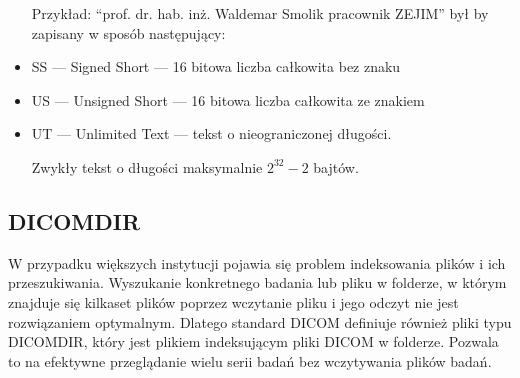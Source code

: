 \begin{itemize}
          Przykład: \enquote{prof. dr. hab. inż. Waldemar Smolik pracownik ZEJIM} był by zapisany w sposób następujący: 

    \item SS --- Signed Short --- 16 bitowa liczba całkowita bez znaku

    \item US --- Unsigned Short --- 16 bitowa liczba całkowita ze znakiem

    \item UT --- Unlimited Text --- tekst o nieograniczonej długości.

          Zwykły tekst o długości maksymalnie $2^{32}-2$ bajtów.
\end{itemize}

\subsection{DICOMDIR}

W przypadku większych instytucji pojawia się problem indeksowania plików i ich przeszukiwania.
Wyszukanie konkretnego badania lub pliku w folderze, w którym znajduje się kilkaset plików poprzez wczytanie pliku i jego odczyt nie jest rozwiązaniem optymalnym.
Dlatego standard DICOM definiuje również pliki typu DICOMDIR, który jest plikiem indeksującym pliki DICOM w folderze.
Pozwala to na efektywne przeglądanie wielu serii badań bez wczytywania plików badań.
